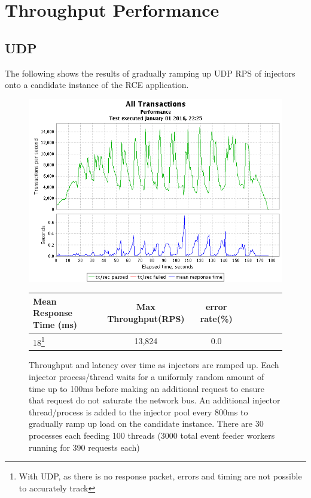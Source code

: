 \documentclass[a4paper,11pt]{scrreprt}
\makeatletter
\newcommand\footnoteref[1]{\protected@xdef\@thefnmark{\ref{#1}}\@footnotemark}
\makeatother
\begin{document}
\section{Throughput Performance}
\subsection{UDP}
The following shows the results of gradually ramping up UDP RPS of injectors onto a candidate instance of the RCE application.

\begin{figure}[h!]
\centering
\caption{Throughput and latency over time as injectors are ramped up. Each injector process/thread waits for a uniformly random amount of time up to 100ms before making an additional request to ensure that request do not saturate the network bus. An additional injector thread/process is added to the injector pool every 800ms to gradually ramp up load on the candidate instance. There are 30 processes each feeding 100 threads (3000 total event feeder workers running for 390 requests each)}
\includegraphics[scale=0.6, trim=0 -25 0 2, clip=true] {UDP_throughput.png}
\label{fig:udpthroughput}
\begin{tabular}{l*{6}{c}r}
Mean Response Time (ms) & Max Throughput(RPS) & error rate(\%)\\
\hline
18\footnote{\label{UDP_errors}With UDP, as there is no response packet, errors and timing are not possible to accurately track} & 13,824 & 0.0\footnoteref{UDP_errors}
\end{tabular}
\end{figure}
\clearpage
\end{document}

